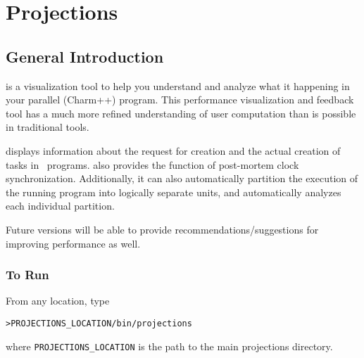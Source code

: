 \section{Projections}

\subsection{General Introduction}
\label{introduction}
\projections{} is a visualization tool to help you understand and analyze what it
happening in your parallel (Charm++) program. This performance visualization and
feedback tool has a much more refined understanding of user computation than is 
possible in traditional tools.

\projections{} displays information about the request for creation and the
actual creation of tasks in \charmpp\ programs. \projections{} also provides the
function of post-mortem clock synchronization. Additionally, it can also
automatically partition the execution of the running program into logically
separate units, and automatically analyzes each individual partition.

Future versions will be able to provide recommendations/suggestions for
improving performance as well.

\subsubsection{To Run \projections{}}
From any location, type
\begin{alltt}
	> PROJECTIONS_LOCATION/bin/projections
\end{alltt}
where {\tt PROJECTIONS\_LOCATION} is the path to the main projections
directory.

